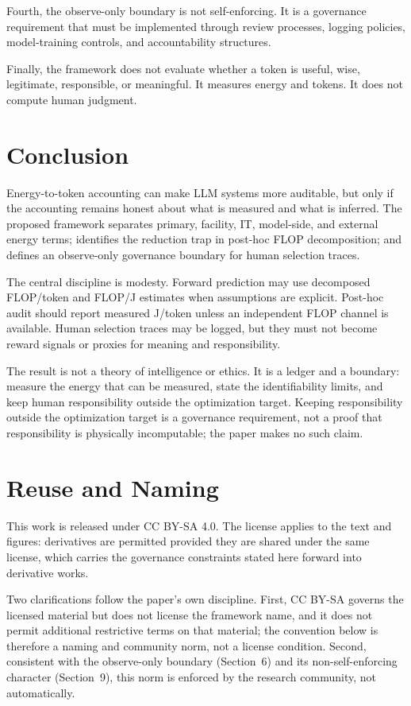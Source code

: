 \documentclass[11pt]{article}
\begin{document}
Fourth, the observe-only boundary is not self-enforcing. It is a governance requirement that must be implemented through review processes, logging policies, model-training controls, and accountability structures.

Finally, the framework does not evaluate whether a token is useful, wise, legitimate, responsible, or meaningful. It measures energy and tokens. It does not compute human judgment.

\section{Conclusion}

Energy-to-token accounting can make LLM systems more auditable, but only if the accounting remains honest about what is measured and what is inferred. The proposed framework separates primary, facility, IT, model-side, and external energy terms; identifies the reduction trap in post-hoc FLOP decomposition; and defines an observe-only governance boundary for human selection traces.

The central discipline is modesty. Forward prediction may use decomposed FLOP/token and FLOP/J estimates when assumptions are explicit. Post-hoc audit should report measured J/token unless an independent FLOP channel is available. Human selection traces may be logged, but they must not become reward signals or proxies for meaning and responsibility.

The result is not a theory of intelligence or ethics. It is a ledger and a boundary: measure the energy that can be measured, state the identifiability limits, and keep human responsibility outside the optimization target. Keeping responsibility outside the optimization target is a governance requirement, not a proof that responsibility is physically incomputable; the paper makes no such claim.

\section*{Reuse and Naming}

This work is released under CC BY-SA 4.0. The license applies to the text and figures: derivatives are permitted provided they are shared under the same license, which carries the governance constraints stated here forward into derivative works.

Two clarifications follow the paper's own discipline. First, CC BY-SA governs the licensed material but does not license the framework name, and it does not permit additional restrictive terms on that material; the convention below is therefore a naming and community norm, not a license condition. Second, consistent with the observe-only boundary (Section~6) and its non-self-enforcing character (Section~9), this norm is enforced by the research community, not automatically.
\end{document}
